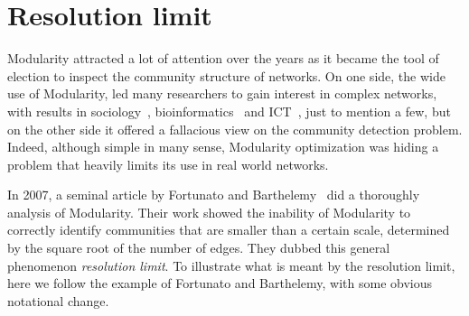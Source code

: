 


\section{Resolution limit}\label{sec:resolutionlimit}
Modularity attracted a lot of attention over the years as it  became the tool of election to inspect the community structure of networks.
On one side, the wide use of Modularity, led many researchers to gain interest in complex networks, with results in sociology~\cite{li2008tag}, bioinformatics~\cite{saracc2012topology} and ICT~\cite{java2007we,leskovec2007dynamics}, just to mention a few, but on the other side it offered a fallacious view on the community detection problem.
Indeed, although simple in many sense, Modularity optimization was hiding a problem that heavily limits its use in real world networks.

In 2007, a seminal article by Fortunato and Barthelemy~\cite{fortunato2007} did a thoroughly analysis of Modularity.
Their work showed the inability of Modularity to correctly identify communities that are smaller than a certain scale, determined by the square root of the number of edges. They dubbed this general phenomenon \emph{resolution limit}.
To illustrate what is meant by the resolution limit, here we follow the example of Fortunato and Barthelemy, with some obvious notational change.

